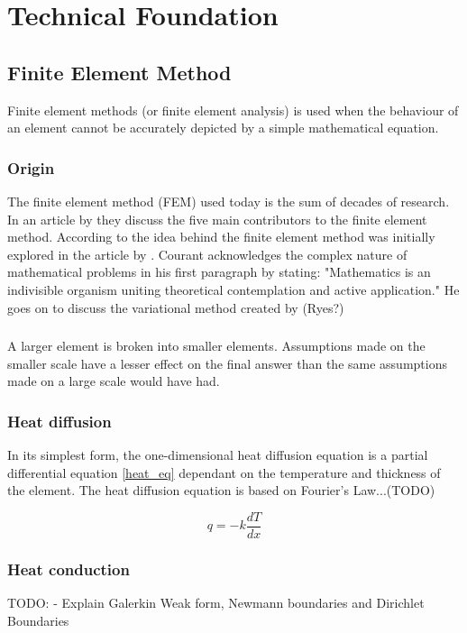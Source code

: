 \chapter{Technical Foundation} \label{tech}
\section{Finite Element Method}\label{femsec}
Finite element methods (or finite element analysis) is used when the behaviour of an element cannot be accurately depicted by a simple mathematical equation. 
	\subsection{Origin}
	The finite element method (FEM) used today is the sum of decades of research. 
	In an article by \citeauthor{Gupta:1996} they discuss the five main contributors to the finite element method. 
	According to \citet{Gupta:1996} the idea behind the finite element method was initially explored in the \citeyear{Courant:1943} article by \citeauthor{Courant:1943}. 
	Courant acknowledges the complex nature of mathematical problems in his first paragraph by stating: "Mathematics is an indivisible organism uniting theoretical contemplation and active application."
	He goes on to discuss the variational method created by (Ryes?)
	
	
	
	\subsection{}
	A larger element is broken into smaller elements. 
	Assumptions made on the smaller scale have a lesser effect on the final answer than the same assumptions made on a large scale would have had.


	\subsection{Heat diffusion}	 
	 In its simplest form, the one-dimensional heat diffusion equation is a partial differential equation \ref{heat_eq} dependant on the temperature and thickness of the element. 
	The heat diffusion equation is based on Fourier's Law...(TODO)
	
	
	\begin{equation}
	\label{heat_eq}
		q = -k \frac{dT}{dx}
	\end{equation}
	\subsection{Heat conduction}
	TODO: - Explain Galerkin Weak form, Newmann boundaries and Dirichlet Boundaries

